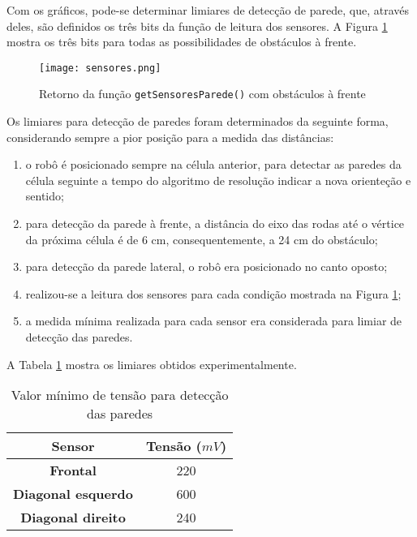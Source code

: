 Com os gráficos, pode-se determinar limiares de detecção de parede, que, através deles, são definidos os três bits da função de leitura dos sensores. A Figura \ref{fig:sensor_bin} mostra os três bits para todas as possibilidades de obstáculos à frente.

\begin{figure}[!htb]
	\caption{\label{fig:sensor_bin}Retorno da função \texttt{getSensoresParede()} com obstáculos à frente}
	\begin{center}
		\texttt{[image: sensores.png]}
	\end{center}
\end{figure}

Os limiares para detecção de paredes foram determinados da seguinte forma, considerando sempre a pior posição para a medida das distâncias: 

\begin{enumerate}[leftmargin=2cm,label=\alph*)]
\item o robô é posicionado sempre na célula anterior, para detectar as paredes da célula seguinte a tempo do algoritmo de resolução indicar a nova orienteção e sentido;
\item para detecção da parede à frente, a distância do eixo das rodas até o vértice da próxima célula é de 6 cm, consequentemente, a 24 cm do obstáculo; 
\item para detecção da parede lateral, o robô era posicionado no canto oposto;
\item realizou-se a leitura dos sensores para cada condição mostrada na Figura \ref{fig:sensor_bin};
\item a medida mínima realizada para cada sensor era considerada para limiar de detecção das paredes.
\end{enumerate}

A Tabela \ref{tab:limiares_sensores} mostra os limiares obtidos experimentalmente.

\begin{table}[!htb]
	\centering
	\caption{\label{tab:limiares_sensores}Valor mínimo de tensão para detecção das paredes}
	\begin{tabular}{c|c}
	 \textbf{Sensor} & \textbf{Tensão} ($mV$) \\ 
	 \hline 
	 \textbf{Frontal} & 220 \\ 
	 \hline 
	 \textbf{Diagonal esquerdo} & 600 \\ 
	 \hline 
	 \textbf{Diagonal direito} & 240 \\ 
	 \end{tabular}  
	
\end{table}

